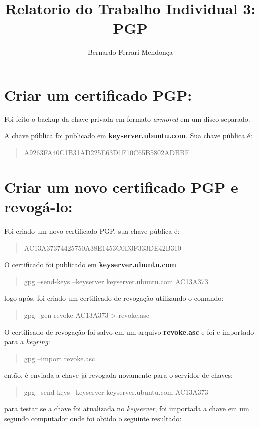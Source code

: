 \documentclass[12pt, letterpaper]{article}
\title{Relatorio do Trabalho Individual 3: PGP}
\author{Bernardo Ferrari Mendonça}
\begin{document}
\maketitle

\section{Criar um certificado PGP:}

Foi feito o backup da chave privada em formato \textit{armored} em um disco separado.

A chave pública foi publicado em \textbf{keyserver.ubuntu.com}. Sua chave pública é:
\begin{quote}
  A9263FA40C1B31AD225E63D1F10C65B5802ADBBE
\end{quote}

\section{Criar um novo certificado PGP e revogá-lo:}

Foi criado um novo certificado PGP, sua chave pública é:

\begin{quote}
  AC13A37374425750A38E1453C0D3F333DE42B310
\end{quote}

O certificado foi publicado em \textbf{keyserver.ubuntu.com}
\begin{quote}
  gpg --send-keys --keyserver keyserver.ubuntu.com AC13A373
\end{quote}
logo após, foi criado um certificado de revogação utilizando o comando:

\begin{quote}
  gpg --gen-revoke AC13A373 \textgreater{} revoke.asc
\end{quote}

O certificado de revogação foi salvo em um arquivo \textbf{revoke.asc}
e foi e importado para a \textit{keyring}:
\begin{quote}
  gpg --import revoke.asc
\end{quote}
então, é enviada a chave já revogada novamente para o servidor de chaves:
\begin{quote}
  gpg --send-keys --keyserver keyserver.ubuntu.com AC13A373
\end{quote}
para testar se a chave foi atualizada no \textit{keyserver},
foi importada a chave em um segundo computador onde foi obtido o seguinte resultado:
\end{document}

